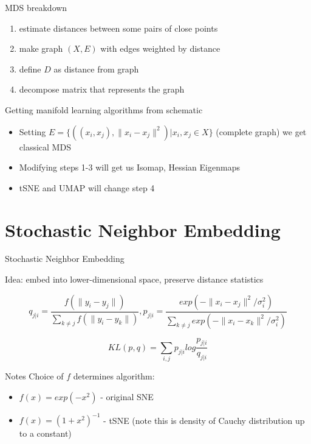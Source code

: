 \documentclass[unknownkeysallowed]{beamer}
\begin{document}
\begin{frame}{MDS breakdown}


\begin{enumerate}
   \item estimate distances between some pairs of close points
   \item make graph $(X, E)$ with edges weighted by distance
   \item define $D$ as distance from graph
   \item decompose matrix that represents the graph
\end{enumerate}{}

\begin{block}{Getting manifold learning algorithms from schematic}

\begin{itemize}
    \item Setting $E = \{((x_i, x_j), \|x_i - x_j\|^2) | x_i, x_j \in X \}$ (complete graph) we get classical MDS
    \item Modifying steps 1-3 will get us Isomap, Hessian Eigenmaps
    \item tSNE and UMAP will change step 4
\end{itemize}
\end{block}



\end{frame}

\section{Stochastic Neighbor Embedding}
\begin{frame}{Stochastic Neighbor Embedding}

Idea: embed into lower-dimensional space, preserve distance statistics

$$q_{j|i} = \frac{f(\|y_i - y_j\|)}{\sum_{k \neq j}f(\|y_i - y_k\|)}, p_{j|i} = \frac{exp(-\|x_i - x_j\|^2 / \sigma^2_i)}{\sum_{k \neq j}exp(-\|x_i - x_k\|^2/\sigma^2_i)}$$

$$KL(p, q) = \sum_{i, j} p_{j|i} log\frac{p_{j|i}}{q_{j|i}}$$

\begin{block}{Notes}
Choice of $f$ determines algorithm:
\begin{itemize}
    \item $f(x) = exp(-x^2)$ - original SNE
    \item $f(x) = (1 + x^2)^{-1}$ - tSNE (note this is density of Cauchy distribution up to a constant)
\end{itemize}
\end{block}
\end{frame}
\end{document}
